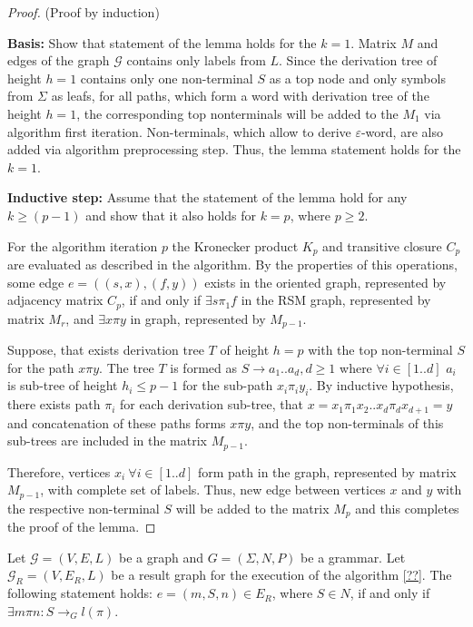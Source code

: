\begin{proof}{(Proof by induction)}

    \textbf{Basis:} Show that statement of the lemma holds for the $k = 1$. Matrix
    $M$ and edges of the graph $\mathcal{G}$ contains only labels from $L$. 
    Since the derivation tree of height $h = 1$ contains only one non-terminal 
    $S$ as a top node and only symbols from $\Sigma$ as leafs, for all paths, 
    which form a word with derivation tree of the height $h = 1$, 
    the corresponding top nonterminals will be added to the $M_1$ via algorithm 
    first iteration. Non-terminals, which allow to derive $\varepsilon$-word, 
    are also added via algorithm preprocessing step. 
    Thus, the lemma statement holds for the $k = 1$.

    \textbf{Inductive step:} Assume that the statement of the lemma hold for any
    $k \geq (p - 1)$ and show that it also holds for $k = p$, where $p \geq 2$.
    
    For the algorithm iteration $p$ the Kronecker product $K_p$ and transitive
    closure $C_p$ are evaluated as described in the algorithm. By the properties
    of this operations, some edge $e = ((s,x),(f,y))$ exists in the oriented
    graph, represented by adjacency matrix $C_p$, if and only if $\exists s
    \pi_1 f$ in the RSM graph, represented by matrix $M_r$, and $\exists x \pi y$
    in graph, represented by $M_{p-1}$. 
    
    Suppose, that exists derivation tree $T$ of height $h = p$ with the top non-terminal
    $S$ for the path $x \pi y$. The tree $T$ is formed as
    $S \to a_1 .. a_d, d \geq 1$ where $\forall i \in [1..d]$ $a_i$ is sub-tree of
    height $h_i \leq p - 1$ for the sub-path $x_i \pi_i y_i$. By inductive hypothesis,
    there exists path $\pi_i$ for each derivation sub-tree, that  
    $x = x_1 \pi_1 x_2 .. x_{d} \pi_{d} x_{d+1} = y$ and concatenation 
    of these paths forms $x \pi y$, and the top non-terminals of 
    this sub-trees are included in the matrix $M_{p - 1}$. 
    
    Therefore, vertices $ x_i ~\forall i \in [1..d]$ form path in the graph, 
    represented by matrix $M_{p-1}$, with complete set of labels.
    Thus, new edge between vertices $x$ and $y$ with the respective 
    non-terminal $S$ will be added to the matrix $M_p$ and this completes 
    the proof of the lemma.

\end{proof}

\begin{theorem}
    Let $\mathcal{G} = (V,E,L)$ be a graph and  $G = (\Sigma, N, P)$ be a grammar.
    Let $\mathcal{G}_R = (V, E_R, L)$  be a result graph for the execution 
    of the algorithm \ref{??}. The following statement holds: 
    $e = (m, S, n) \in E_R$, where $S \in N$, if and only if 
    $\exists m \pi n: S \to_G l(\pi)$. 
\end{theorem}{}
    
